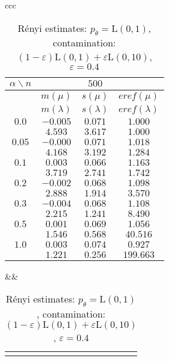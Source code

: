 {\begin{table}[htb] \footnotesize
\begin{center}
\begin{tabular}{ccc}
	\begin{tabular}{|c|ccc|}
	\hline
	$\alpha\backslash n$ &&  $500$ & \\
	\hline
	& $m(\mu)$ & $s(\mu)$ & $eref(\mu)$ \\
	& $m(\lambda)$ & $s(\lambda)$ & $eref(\lambda)$ \\
	\hline
	$0.0$ & $ -0.005 $ & $ 0.071 $ & $ 1.000 $\\
	 & $ 4.593 $ & $ 3.617 $ & $ 1.000 $\\
	\hline
	$0.05$ & $ -0.000 $ & $ 0.071 $ & $ 1.018 $\\
	 & $ 4.168 $ & $ 3.192 $ & $ 1.284 $\\
	\hline
	$0.1$ & $ 0.003 $ & $ 0.066 $ & $ 1.163 $\\
	 & $ 3.719 $ & $ 2.741 $ & $ 1.742 $\\
	\hline
	$0.2$ & $ -0.002 $ & $ 0.068 $ & $ 1.098 $\\
	 & $ 2.888 $ & $ 1.914 $ & $ 3.570 $\\
	\hline
	$0.3$ & $ -0.004 $ & $ 0.068 $ & $ 1.108 $\\
	 & $ 2.215 $ & $ 1.241 $ & $ 8.490 $\\
	\hline
	$0.5$ & $ 0.001 $ & $ 0.069 $ & $ 1.056 $\\
	 & $ 1.546 $ & $ 0.568 $ & $ 40.516 $\\
	\hline
	$1.0$ & $ 0.003 $ & $ 0.074 $ & $ 0.927 $\\
	 & $ 1.221 $ & $ 0.256 $ & $ 199.663 $\\
	\hline
	\end{tabular}
&&
	\begin{tabular}{c}
		\epsfig{file=Laplace-e04-eref.eps, height=2.5in}
	\end{tabular}
\\
\end{tabular}
\end{center}
\caption{R\'{e}nyi estimates: $p_\theta = \mathrm{L}(0,1)$, contamination: $(1-\varepsilon)\mathrm{L}(0,1) + \varepsilon \mathrm{L}(0,10)$, $\varepsilon =  0.4$}
\label{tabJK:laplace-eref}
\end{table}

}
